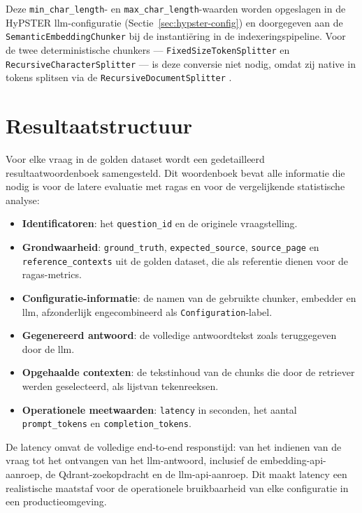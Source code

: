 Deze \texttt{min\_char\_length}- en \texttt{max\_char\_length}-waarden worden opgeslagen in de HyPSTER \gls{llm}-configuratie (Sectie~\ref{sec:hypster-config}) en doorgegeven aan de \texttt{SemanticEmbeddingChunker} bij de instantiëring in de indexeringspipeline. Voor de twee deterministische chunkers — \texttt{FixedSizeTokenSplitter} en \texttt{RecursiveCharacterSplitter} — is deze conversie niet nodig, omdat zij native in tokens splitsen via de \texttt{RecursiveDocumentSplitter} \autocite{HaystackRecusriveSplitter2026}.

\section{Resultaatstructuur}
\label{sec:resultaat-structuur}

Voor elke vraag in de golden dataset wordt een gedetailleerd resultaatwoordenboek samengesteld. Dit woordenboek bevat alle informatie die nodig is voor de latere evaluatie met \gls{ragas} en voor de vergelijkende statistische analyse:

\begin{itemize}
  \item \textbf{Identificatoren}: het \texttt{question\_id} en de originele vraagstelling.
  \item \textbf{Grondwaarheid}: \texttt{ground\_truth}, \texttt{expected\_source}, \texttt{source\_page} en\\\texttt{reference\_contexts} uit de golden dataset, die als referentie dienen voor de \gls{ragas}-metrics.
  \item \textbf{Configuratie-informatie}: de namen van de gebruikte chunker, embedder en \gls{llm}, afzonderlijk engecombineerd als \texttt{Configuration}-label.
  \item \textbf{Gegenereerd antwoord}: de volledige antwoordtekst zoals teruggegeven door de \gls{llm}.
  \item \textbf{Opgehaalde contexten}: de tekstinhoud van de chunks die door de retriever werden geselecteerd, als lijstvan tekenreeksen.
  \item \textbf{Operationele meetwaarden}: \texttt{latency} in seconden, het aantal \texttt{prompt\_tokens} en \texttt{completion\_tokens}.
\end{itemize}

De latency omvat de volledige end-to-end responstijd: van het indienen van de vraag tot het ontvangen van het \gls{llm}-antwoord, inclusief de embedding-\gls{api}-aanroep, de Qdrant-zoekopdracht en de \gls{llm}-\gls{api}-aanroep. Dit maakt latency een realistische maatstaf voor de operationele bruikbaarheid van elke configuratie in een productieomgeving.
